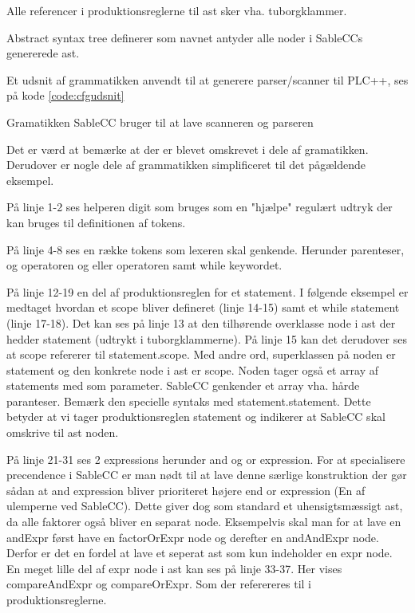 Alle referencer i produktionsreglerne til \gls{ast} sker vha. tuborgklammer. 

Abstract syntax tree definerer som navnet antyder alle noder i SableCCs genererede \gls{ast}.

Et udsnit af grammatikken anvendt til at generere parser/scanner til PLC++, ses på kode \ref{code:cfgudsnit}

Gramatikken SableCC bruger til at lave scanneren og parseren


\noindent Det er værd at bemærke at der er blevet omskrevet i dele af gramatikken. Derudover er nogle dele af grammatikken simplificeret til det pågældende eksempel.

På linje 1-2 ses helperen digit som bruges som en "hjælpe" regulært udtryk der kan bruges til definitionen af tokens.

På linje 4-8 ses en række tokens som lexeren skal genkende. Herunder parenteser, og operatoren og eller operatoren samt while keywordet.

På linje 12-19 en del af produktionsreglen for et statement. I følgende eksempel er medtaget hvordan et scope bliver defineret (linje 14-15) samt et while statement (linje 17-18). Det kan ses på linje 13 at den tilhørende overklasse node i \gls{ast} der hedder statement (udtrykt i tuborgklammerne). På linje 15 kan det derudover ses at scope refererer til statement.scope. Med andre ord, superklassen på noden er statement og den konkrete node i \gls{ast} er scope. Noden tager også et array af statements med som parameter. SableCC genkender et array vha. hårde paranteser. Bemærk den specielle syntaks med statement.statement. Dette betyder at vi tager produktionsreglen statement og indikerer at SableCC skal omskrive til \gls{ast} noden.

På linje 21-31 ses 2 expressions herunder and og or expression. For at specialisere precendence i SableCC er man nødt til at lave denne særlige konstruktion der gør sådan at and expression bliver prioriteret højere end or expression (En af ulemperne ved SableCC). Dette giver dog som standard et uhensigtsmæssigt \gls{ast}, da alle faktorer også bliver en separat node. Eksempelvis skal man for at lave en andExpr først have en factorOrExpr node og derefter en andAndExpr node. Derfor er det en fordel at lave et seperat \gls{ast} som kun indeholder en expr node. En meget lille del af expr node i \gls{ast} kan ses på linje 33-37. Her vises compareAndExpr og compareOrExpr. Som der referereres til i produktionsreglerne.


